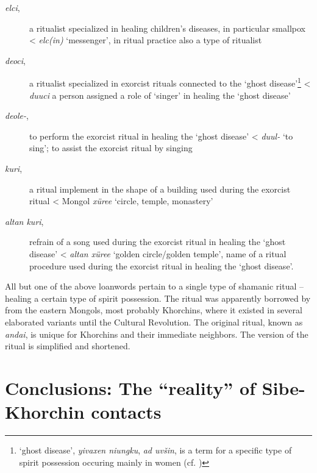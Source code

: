 \documentclass[output=paper,colorlinks,citecolor=brown]{langscibook}
\begin{document}
\begin{description}
\item[\textit{elci},] a ritualist specialized in healing children’s diseases, in particular smallpox <  \textit{elc(in)} ‘messenger’, in  ritual practice also a type of ritualist

\item[\textit{deoci},] a ritualist specialized in exorcist rituals connected to the ‘ghost disease’\footnote{ ‘ghost disease’,  \textit{yivaxen niungku},  \textit{ad uvšin}, is a term for a specific type of spirit possession occuring mainly in women (cf. \citealt{Zikmundová2013b})} <  \textit{duuci} a person assigned a role of ‘singer’ in healing the ‘ghost disease’

\item[\textit{deole-},] to perform the exorcist ritual in healing the ‘ghost disease’ <  \textit{duul-} ‘to sing’; to assist the exorcist ritual by singing

\item[\textit{kuri},] a ritual implement in the shape of a building used during the exorcist ritual < Mongol \textit{xüree} ‘circle, temple, monastery’

\item[\textit{altan kuri},] refrain of a song used during the exorcist ritual in healing the ‘ghost disease’ <  \textit{altan xüree} ‘golden circle/golden temple’, name of a ritual procedure used during the exorcist ritual in healing the ‘ghost disease’.
\end{description}

All but one of the above  loanwords pertain to a single type of shamanic ritual – healing a certain type of spirit possession. The ritual was apparently borrowed by  from the eastern Mongols, most probably Khorchins, where it existed in several elaborated variants until the Cultural Revolution. The original  ritual, known as \textit{andai}, is unique for Khorchins and their immediate neighbors. The  version of the ritual is simplified and shortened.


\section{Conclusions: The “reality” of Sibe-Khorchin contacts}
\end{document}
